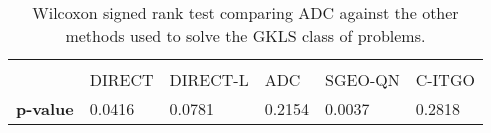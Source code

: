 \begin{table*}[h]
    \tiny
    \begin{center}
    
    \begin{tabular}{ P{1.0cm} P{1.0cm} P{1.2cm} P{1.0cm} P{1.0cm} P{1.0cm} }
                     &         &          &          &          &        \\[2em]
                     &  DIRECT & DIRECT-L &    ADC   &    SGEO-QN   & C-ITGO \\[1em]
    \rule{0pt}{3ex}
    \textbf{p-value} & 0.0416 & 0.0781 & 0.2154 & 0.0037 & 0.2818 \\


    \end{tabular}
    \end{center}
    \vspace*{-4mm}
    \captionsetup{justification=centering}
    \caption{Wilcoxon signed rank test comparing ADC against the other methods used to solve the GKLS class of problems. \\[2em]}
    \label{tab:Wilcoxon2}
\end{table*}